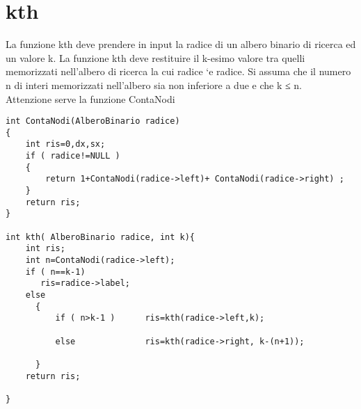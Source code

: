 \documentclass[a4paper,12pt,openany]{book}
\begin{document}
\section{kth}
La funzione kth deve prendere in input la radice di un albero binario di ricerca ed un valore k. La funzione kth deve restituire il k-esimo valore tra quelli memorizzati nell’albero di ricerca la cui radice `e radice. Si assuma che il numero n di interi memorizzati nell’albero sia non inferiore a due e che k ≤ n.\\
Attenzione serve la funzione ContaNodi
\begin{lstlisting}
int ContaNodi(AlberoBinario radice)
{
    int ris=0,dx,sx;
    if ( radice!=NULL )
    {
        return 1+ContaNodi(radice->left)+ ContaNodi(radice->right) ;
    }
    return ris;
}

int kth( AlberoBinario radice, int k){
    int ris;
    int n=ContaNodi(radice->left);
    if ( n==k-1)
       ris=radice->label;
    else
      {
          if ( n>k-1 )      ris=kth(radice->left,k);
          
          else              ris=kth(radice->right, k-(n+1));
          
      }
    return ris;
 
}
\end{lstlisting}
\end{document}

